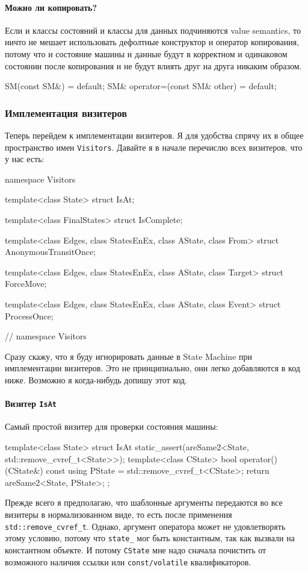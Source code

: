 \documentclass{article}
\begin{document}
{\paragraph{Можно ли копировать?}

Если и классы состояний и классы для данных подчиняются value semantics, то ничто не мешает использовать дефолтные конструктор и оператор копирования, потому что и состояние машины и данные будут в корректном и одинаковом состоянии после копирования и не будут влиять друг на друга никаким образом.
\begin{cppcode}
SM(const SM&) = default;
SM& operator=(const SM& other) = default;
\end{cppcode}

\subsubsection{Имплементация визитеров}

Теперь перейдем к имплементации визитеров.
Я для удобства спрячу их в общее пространство имен \verb"Visitors".
Давайте я в начале перечислю всех визитеров, что у нас есть:
\begin{cppcode}
namespace Visitors {
template<class State>
struct IsAt;

template<class FinalStates>
struct IsComplete;

template<class Edges, class StatesEnEx, class AState, class From>
struct AnonymousTransitOnce;

template<class Edges, class StatesEnEx, class AState, class Target>
struct ForceMove;

template<class Edges, class StatesEnEx, class AState, class Event>
struct ProcessOnce;
} // namespace Visitors 
\end{cppcode}
Сразу скажу, что я буду игнорировать данные в State Machine при имплементации визитеров.
Это не принципиально, они легко добавляются в код ниже.
Возможно я когда-нибудь допишу этот код.

\paragraph{Визитер \texttt{IsAt}}

Самый простой визитер для проверки состояния машины:
\begin{cppcode}
template<class State>
struct IsAt {
  static_assert(areSame2<State, std::remove_cvref_t<State>>);
  template<class CState>
  bool operator()(CState&) const {
    using PState = std::remove_cvref_t<CState>;
    return areSame2<State, PState>;
  }
};
\end{cppcode}
Прежде всего я предполагаю, что шаблонные аргументы передаются во все визитеры в нормализованном виде, то есть после применения \verb"std::remove_cvref_t".
Однако, аргумент оператора может не удовлетворять этому условию, потому что \verb"state_" мог быть константным, так как вызвали на константном объекте.
И потому \verb"CState" мне надо сначала почистить от возможного наличия ссылки или \verb"const/volatile" квалификаторов.

}
\end{document}
